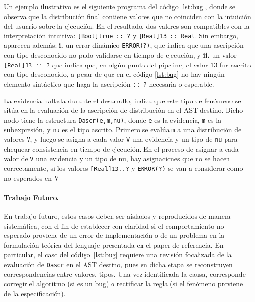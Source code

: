 Un ejemplo ilustrativo es el siguiente programa del código
\ref{lst:bug}, donde se observa que la distribución final contiene
valores que no coinciden con la intuición del usuario sobre la
ejecución. En el resultado, dos valores son compatibles con la
interpretación intuitiva: \lstinline|[Bool]true :: ?| y
\lstinline|[Real]13 :: Real|.  Sin embargo, aparecen además: \textbf{i.} un
error dinámico \lstinline|ERROR(?)|, que indica que una ascripción con
tipo desconocido no pudo validarse en tiempo de ejecución, y \textbf{ii.} un
valor \lstinline|[Real]13 :: ?| que indica que, en algún punto del
pipeline, el valor $13$ fue ascrito con tipo desconocido, a pesar
de que en el código \ref{lst:bug} no hay ningún elemento sintáctico
que haga la ascripción \lstinline|:: ?| necesaria o esperable.


La evidencia hallada durante el desarrollo, indica
que este tipo de fenómeno se sitúa en la
evaluación de la ascripción de distribución en el
AST destino. Dicho nodo tiene la estructura
\lstinline|Dascr(e,m,nu)|, donde \lstinline|e| es
la evidencia, \lstinline|m| es la subexpresión, y
\lstinline|nu| es el tipo ascrito. Primero se
evalúa \verb|m| a una distribución de valores \verb|V|, y
luego se asigna a cada valor \verb|V| una evidencia y
un tipo de \verb|nu| para chequear consistencia en
tiempo de ejecución. En el proceso de asignar a cada valor de
\verb|V| una evidencia y un tipo de nu, hay asignaciones
que no se hacen correctamente, si los valores
\lstinline|[Real]13::?| y \lstinline|ERROR(?)| se van a considerar como no
esperados en V

\paragraph{Trabajo Futuro.}
En trabajo futuro, estos casos deben ser aislados y reproducidos de
manera sistemática, con el fin de establecer con claridad si el
comportamiento no esperado proviene de un error de implementación o de
un problema en la formulación teórica del lenguaje presentada en el
paper de referencia.  En particular, el caso del código~\ref{lst:bug}
requiere una revisión focalizada de la evaluación de \lstinline|Dascr|
en el AST destino, pues en dicha etapa se reconstruyen
correspondencias entre valores, tipos.
Una vez identificada la causa,
corresponde corregir el algoritmo (si es un bug) o 
rectificar la regla (si el fenómeno proviene de la
especificación). 

